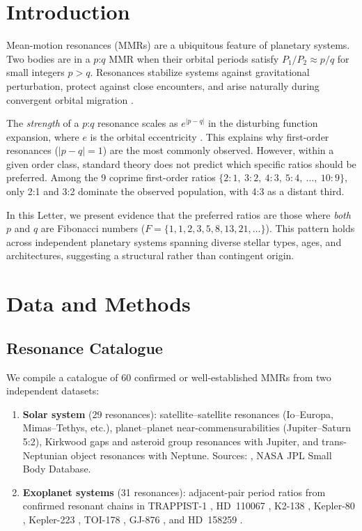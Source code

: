 \documentclass[twocolumn,11pt]{article}
\begin{document}
\section{Introduction}
\label{sec:intro}

Mean-motion resonances (MMRs) are a ubiquitous feature of planetary
systems.  Two bodies are in a $p$:$q$ MMR when their orbital periods
satisfy $P_1/P_2 \approx p/q$ for small integers $p > q$.  Resonances
stabilize systems against gravitational perturbation, protect against
close encounters, and arise naturally during convergent orbital
migration \citep{murray1999,peale1976}.

The \emph{strength} of a $p$:$q$ resonance scales as $e^{|p-q|}$
in the disturbing function expansion, where $e$ is the orbital
eccentricity \citep{murray1999}.  This explains why first-order
resonances ($|p-q| = 1$) are the most commonly observed.  However,
within a given order class, standard theory does not predict which
specific ratios should be preferred.  Among the 9 coprime first-order
ratios $\{2\!:\!1,\ 3\!:\!2,\ 4\!:\!3,\ 5\!:\!4,\ \ldots,\
10\!:\!9\}$, only 2:1 and 3:2 dominate the observed population, with
4:3 as a distant third.

In this Letter, we present evidence that the preferred ratios are
those where \emph{both} $p$ and $q$ are Fibonacci numbers
($F = \{1, 1, 2, 3, 5, 8, 13, 21, \ldots\}$).  This pattern holds
across independent planetary systems spanning diverse stellar types,
ages, and architectures, suggesting a structural rather than
contingent origin.

\section{Data and Methods}
\label{sec:data}

\subsection{Resonance Catalogue}

We compile a catalogue of 60 confirmed or well-established
MMRs from two independent datasets:

\begin{enumerate}
\item \textbf{Solar system} (29 resonances): satellite--satellite
resonances (Io--Europa, Mimas--Tethys, etc.), planet--planet near-commensurabilities (Jupiter--Saturn 5:2), Kirkwood gaps and asteroid
group resonances with Jupiter, and trans-Neptunian object resonances
with Neptune.  Sources: \citet{murray1999}, NASA JPL Small Body
Database.

\item \textbf{Exoplanet systems} (31 resonances): adjacent-pair
period ratios from confirmed resonant chains in TRAPPIST-1
\citep{luger2017}, HD~110067 \citep{luque2024}, K2-138
\citep{christiansen2018}, Kepler-80 \citep{macdonald2016},
Kepler-223 \citep{mills2016}, TOI-178 \citep{leleu2021}, GJ-876
\citep{rivera2010}, and HD~158259 \citep{hara2020}.
\end{enumerate}
\end{document}
